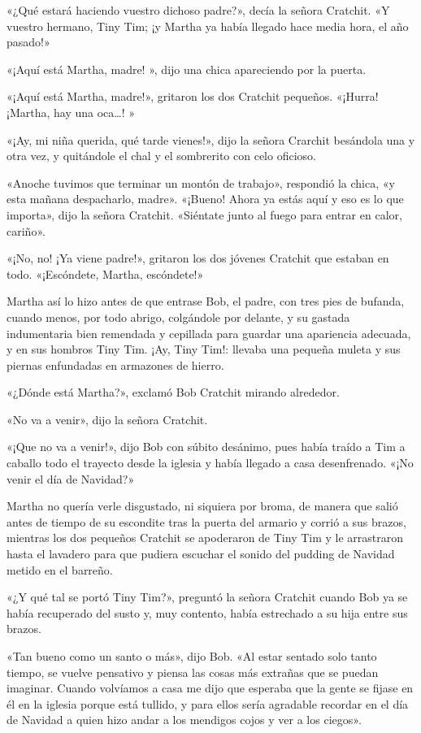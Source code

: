 \documentclass{novela}
\begin{document}
 «¿Qué estará haciendo vuestro dichoso padre?», decía la señora Cratchit. «Y vuestro hermano, Tiny Tim; ¡y Martha ya había llegado hace media hora, el año pasado!»

 «¡Aquí está Martha, madre! », dijo una chica apareciendo por la puerta.

 «¡Aquí está Martha, madre!», gritaron los dos Cratchit pequeños. «¡Hurra! ¡Martha, hay una oca{\ldots}! »

 «¡Ay, mi niña querida, qué tarde vienes!», dijo la señora Crarchit besándola una y otra vez, y quitándole el chal y el sombrerito con celo oficioso.

 «Anoche tuvimos que terminar un montón de trabajo», respondió la chica, «y esta mañana despacharlo, madre». «¡Bueno! Ahora ya estás aquí y eso es lo que importa», dijo la señora Cratchit. «Siéntate junto al fuego para entrar en calor, cariño».

 «¡No, no! ¡Ya viene padre!», gritaron los dos jóvenes Cratchit que estaban en todo. «¡Escóndete, Martha, escóndete!»

 Martha así lo hizo antes de que entrase Bob, el padre, con tres pies de bufanda, cuando menos, por todo abrigo, colgándole por delante, y su gastada indumentaria bien remendada y cepillada para guardar una apariencia adecuada, y en sus hombros Tiny Tim. ¡Ay, Tiny Tim!: llevaba una pequeña muleta y sus piernas enfundadas en armazones de hierro.

 «¿Dónde está Martha?», exclamó Bob Cratchit mirando alrededor.

 «No va a venir», dijo la señora Cratchit.

 «¡Que no va a venir!», dijo Bob con súbito desánimo, pues había traído a Tim a caballo todo el trayecto desde la iglesia y había llegado a casa desenfrenado. «¡No venir el día de Navidad?»

 Martha no quería verle disgustado, ni siquiera por broma, de manera que salió antes de tiempo de su escondite tras la puerta del armario y corrió a sus brazos, mientras los dos pequeños Cratchit se apoderaron de Tiny Tim y le arrastraron hasta el lavadero para que pudiera escuchar el sonido del pudding de Navidad metido en el barreño.

 «¿Y qué tal se portó Tiny Tim?», preguntó la señora Cratchit cuando Bob ya se había recuperado del susto y, muy contento, había estrechado a su hija entre sus brazos.

 «Tan bueno como un santo o más», dijo Bob. «Al estar sentado solo tanto tiempo, se vuelve pensativo y piensa las cosas más extrañas que se puedan imaginar. Cuando volvíamos a casa me dijo que esperaba que la gente se fijase en él en la iglesia porque está tullido, y para ellos sería agradable recordar en el día de Navidad a quien hizo andar a los mendigos cojos y ver a los ciegos».
\end{document}

